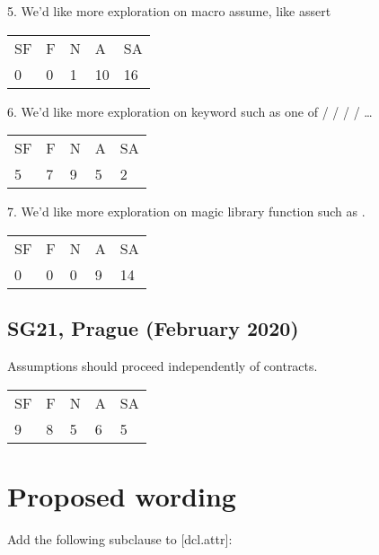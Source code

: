 5. We’d like more exploration on macro assume, like assert

\hspace{6mm}
\begin{tabular}{lllll}
SF & F & N & A & SA \\
0 & 0 & 1 & 10 & 16
\end{tabular}

6. We’d like more exploration on keyword such as one of  /  /  /  / …

\hspace{6mm}
\begin{tabular}{lllll}
SF & F & N & A & SA \\
5 & 7 & 9 & 5 & 2
\end{tabular}

7. We’d like more exploration on magic library function such as .

\hspace{6mm}
\begin{tabular}{lllll}
SF & F & N & A & SA \\
0 & 0 & 0 & 9 & 14
\end{tabular}

\subsection{SG21, Prague (February 2020)}

Assumptions should proceed independently of contracts.

\hspace{6mm}
\begin{tabular}{lllll}
SF & F & N & A & SA \\
9 & 8 & 5 & 6 & 5
\end{tabular}

\section{Proposed wording}

Add the following subclause to [dcl.attr]:

